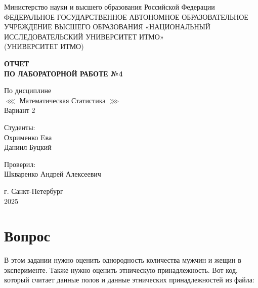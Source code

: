 \documentclass[14pt]{extreport}
\begin{document}
	
	\begin{titlepage}
		\centering
		\vspace*{1cm}
		
		{\large Министерство науки и высшего образования Российской Федерации}\\
		{\large ФЕДЕРАЛЬНОЕ ГОСУДАРСТВЕННОЕ АВТОНОМНОЕ ОБРАЗОВАТЕЛЬНОЕ УЧРЕЖДЕНИЕ ВЫСШЕГО ОБРАЗОВАНИЯ «НАЦИОНАЛЬНЫЙ ИССЛЕДОВАТЕЛЬСКИЙ УНИВЕРСИТЕТ ИТМО»}\\
		{\large (УНИВЕРСИТЕТ ИТМО)}\\
		
		\vspace{1cm}
		
		\textbf{{\Huge ОТЧЕТ}\\
			{\Huge ПО ЛАБОРАТОРНОЙ РАБОТЕ №4}}\\
		
		\vspace{1cm}
		
		{\LARGE По дисциплине\\
			\(\lll\) Математическая Статистика \(\ggg\) }\\
			Вариант 2
		
		\vspace{2cm}
		
		{\Large Студенты:}\\
		Охрименко Eва\\
		Даниил Буцкий
		
		
		\vspace{2cm}
		
		{\Large Проверил:}\\
		Шкваренко Андрей Алексеевич\\
		
		\vspace{2cm}
		
		{\large г. Санкт-Петербург}\\
		{\large 2025}
		
	\end{titlepage}
	\tableofcontents  %
	\newpage

	
	
	\section{Вопрос}
	
	
	В этом задании нужно оценить однородность количества мужчин и жещин в эксперименте. Также нужно оценить этническую принадлежность. Вот код, который считает данные полов и данные этнических принадлежностей из файла:
	
\end{document}
